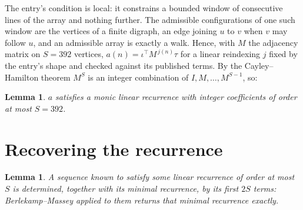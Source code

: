 \documentclass[11pt,a4paper]{article}
\theoremstyle{plain}
\newtheorem{lemma}[theorem]{Lemma}
\theoremstyle{definition}
\begin{document}
The entry's condition is local: it constrains a bounded window of consecutive lines of the
array and nothing further. The admissible configurations of one such window are the vertices
of a finite digraph, an edge joining $u$ to $v$ when $v$ may follow $u$, and an admissible
array is exactly a walk. Hence, with $M$ the adjacency matrix on $S=392$ vertices,
$a(n)=\iota^{\!\top}M^{\,j(n)}\tau$ for a linear reindexing $j$ fixed by the entry's shape
and checked against its published terms. By the Cayley--Hamilton theorem $M^{S}$ is an
integer combination of $I,M,\dots,M^{S-1}$, so:

\begin{lemma}\label{lem:cf}
$a$ satisfies a monic linear recurrence with integer coefficients of order at most $S=392$.
\end{lemma}

\section{Recovering the recurrence}

\begin{lemma}\label{lem:bm}
A sequence known to satisfy some linear recurrence of order at most $S$ is determined, together
with its minimal recurrence, by its first $2S$ terms: Berlekamp--Massey applied to them returns
that minimal recurrence exactly.
\end{lemma}
\end{document}
